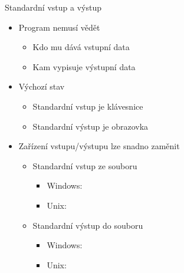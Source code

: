 \begin{frame}{Standardní vstup a výstup}

  \begin{itemize}
    \item Program nemusí vědět
    \begin{itemize}
      \item Kdo mu dává vstupní data
      \item Kam vypisuje výstupní data
    \end{itemize}

    \pause

    \item Výchozí stav
    \begin{itemize}
      \item Standardní vstup je klávesnice
      \item Standardní výstup je obrazovka
    \end{itemize}

    \pause

    \item Zařízení vstupu/výstupu lze snadno zaměnit
    \begin{itemize}
      \item Standardní vstup ze souboru
      \begin{itemize}
	\item Windows: 
	\item Unix: 
      \end{itemize}

      \pause

      \item Standardní výstup do souboru
      \begin{itemize}
	\item Windows: 
	\item Unix: 
      \end{itemize}
    \end{itemize}

  \end{itemize}

\end{frame}

